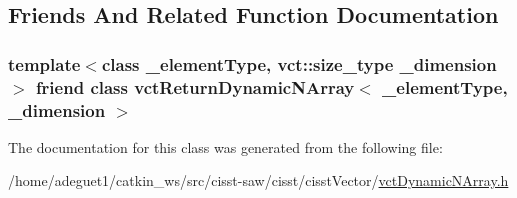 \subsection{Friends And Related Function Documentation}
\hypertarget{classvct_dynamic_n_array_a0887bdbfe80a80b92caf2ced650d161a}{
\subsubsection[{vct\-Return\-Dynamic\-N\-Array$<$ \-\_\-element\-Type, \-\_\-dimension $>$}]{\setlength{\rightskip}{0pt plus 5cm}template$<$class \-\_\-element\-Type, vct\-::size\-\_\-type \-\_\-dimension$>$ friend class {\bf vct\-Return\-Dynamic\-N\-Array}$<$ \-\_\-element\-Type, \-\_\-dimension $>$\hspace{0.3cm}{\ttfamily [friend]}}}\label{classvct_dynamic_n_array_a0887bdbfe80a80b92caf2ced650d161a}


The documentation for this class was generated from the following file\-:\begin{DoxyCompactItemize}
\item 
/home/adeguet1/catkin\-\_\-ws/src/cisst-\/saw/cisst/cisst\-Vector/\hyperlink{vct_dynamic_n_array_8h}{vct\-Dynamic\-N\-Array.\-h}\end{DoxyCompactItemize}
